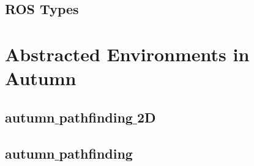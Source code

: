 \subsection{ROS Types}

\section{Abstracted Environments in Autumn}

\subsection{autumn$\_$pathfinding$\_$2D}

\subsection{autumn$\_$pathfinding}